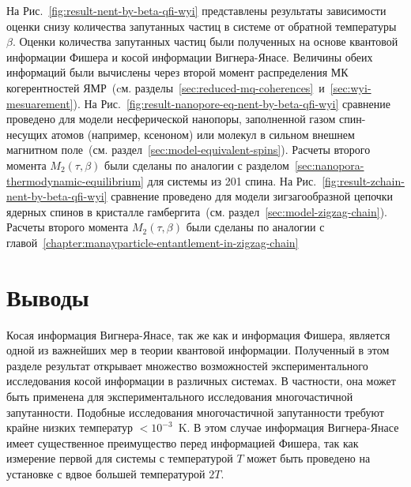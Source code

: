 На Рис.~\ref{fig:result-nent-by-beta-qfi-wyi} представлены результаты зависимости
оценки снизу количества запутанных частиц в системе от обратной температуры $\beta$.
Оценки количества запутанных частиц были полученных на основе квантовой информации Фишера и косой информации Вигнера-Янасе.
Величины обеих информаций были вычислены через второй момент распределения МК когерентностей ЯМР~(cм.
разделы~\ref{sec:reduced-mq-coherences}~и~\ref{sec:wyi-mesuarement}).
На Рис.~\ref{fig:result-nanopore-eq-nent-by-beta-qfi-wyi} сравнение проведено для модели несферической нанопоры,
заполненной газом спин-несущих атомов (например, ксеноном) или молекул в сильном внешнем магнитном поле~(см. раздел~\ref{sec:model-equivalent-spins}).
Расчеты второго момента $M_2(\tau, \beta)$ были сделаны по аналогии с разделом~\ref{sec:nanopora-thermodynamic-equilibrium} для системы из 201 спина.
На Рис.~\ref{fig:result-zchain-nent-by-beta-qfi-wyi} сравнение проведено
для модели зигзагообразной цепочки ядерных спинов в кристалле гамбергита~(см. раздел~\ref{sec:model-zigzag-chain}).
Расчеты второго момента $M_2(\tau, \beta)$ были сделаны по аналогии с главой~\ref{chapter:manayparticle-entantlement-in-zigzag-chain}


\section{Выводы}
Косая информация Вигнера-Янасе, так же как и информация Фишера,
является одной из важнейших мер в теории квантовой информации.
Полученный в этом разделе результат открывает множество возможностей
экспериментального исследования косой информации в различных системах.
В частности, она может быть применена для экспериментального исследования многочастичной запутанности.
Подобные исследования многочастичной запутанности требуют крайне низких температур $<10^{-3}$~K.
В этом случае информация Вигнера-Янасе имеет существенное преимущество перед информацией Фишера,
так как измерение первой для системы с температурой $T$
может быть проведено на установке с вдвое большей температурой $2T$.
